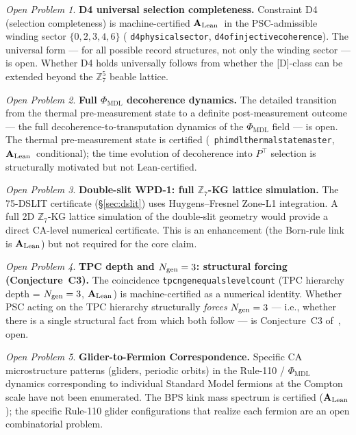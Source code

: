 \documentclass[11pt,openany]{book}
\theoremstyle{remark}
\newtheorem{openprob}{Open Problem}[chapter]
\newcommand{\MDL}{\text{MDL}}
\newcommand{\lean}[1]{%
  \penalty-100
  \begingroup\def\_{\textunderscore\allowbreak}\texttt{#1}\endgroup}
\newcommand{\CatAL}{\ensuremath{\textbf{A}_{\rm Lean}}}
\begin{document}
\begin{openprob}
\textbf{D4 universal selection completeness.}
Constraint D4 (selection completeness) is machine-certified \CatAL\ in the
PSC-admissible winding sector $\{0,2,3,4,6\}$
(\lean{d4\_physical\_sector}, \lean{d4\_of\_injective\_coherence}).
The universal form --- for all possible record structures, not only the winding sector
--- is open.  Whether D4 holds universally follows from whether the [D]-class can be
extended beyond the $\mathbb{Z}_7^5$ beable lattice.
\end{openprob}

\begin{openprob}
\textbf{Full $\Phi_{\MDL}$ decoherence dynamics.}
The detailed transition from the thermal pre-measurement state to a definite post-measurement
outcome --- the full decoherence-to-transputation dynamics of the $\Phi_{\MDL}$ field ---
is open.  The thermal pre-measurement state is certified \mbox{(\lean{phimdl\_thermal\_state\_master},
\CatAL\ conditional)}; the time evolution of decoherence into $P^\top$ selection is
structurally motivated but not Lean-certified.
\end{openprob}

\begin{openprob}
\textbf{Double-slit WPD-1: full $\mathbb{Z}_7$-KG lattice simulation.}
The 75-DSLIT certificate (§\ref{sec:dslit}) uses Huygens--Fresnel Zone-L1 integration.
A full 2D $\mathbb{Z}_7$-KG lattice simulation of the double-slit geometry would provide
a direct CA-level numerical certificate.  This is an enhancement (the Born-rule link
is \CatAL) but not required for the core claim.
\end{openprob}

\begin{openprob}
\textbf{TPC depth and $N_{\rm gen} = 3$: structural forcing (Conjecture~C3).}
The coincidence \lean{tpc\_ngen\_equals\_level\_count} (TPC hierarchy depth = $N_{\rm gen}
= 3$, \CatAL) is machine-certified as a numerical identity.  Whether PSC acting on the
TPC hierarchy structurally \emph{forces} $N_{\rm gen} = 3$ --- i.e., whether there is a
single structural fact from which both follow --- is Conjecture~C3
of~\cite{SpivackGTEMobius}, open.
\end{openprob}

\begin{openprob}
\textbf{Glider-to-Fermion Correspondence.}
Specific CA microstructure patterns (gliders, periodic orbits) in the Rule-110 / $\Phi_{\MDL}$
dynamics corresponding to individual Standard Model fermions at the Compton scale have
not been enumerated.  The BPS kink mass spectrum is certified (\CatAL); the specific
Rule-110 glider configurations that realize each fermion are an open combinatorial problem.
\end{openprob}
\end{document}
